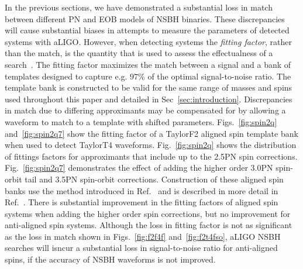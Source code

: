 In the previous sections, we have demonstrated a substantial loss in match between
different \ac{PN} and EOB models of \ac{NSBH} binaries. These discrepancies
will cause substantial biases in attempts to measure the parameters of
detected systems with aLIGO. However, when detecting systems the
\emph{fitting factor}, rather than the match, is the quantity that is used to
assess the effectualness of a search~\cite{Apostolatos:1996rf}. The fitting
factor maximizes the match between a signal and a bank of templates designed
to capture e.g. $97\%$ of the optimal signal-to-noise ratio. The template bank is constructed to be 
valid for the same range of masses and spins used
throughout this paper and detailed in Sec~\ref{sec:introduction}. Discrepancies in
match due to differing approximants may be compensated for by allowing a waveform
to match to a template with shifted parameters.
Figs.~\ref{fig:spin2q} and~\ref{fig:spin2q7} show the fitting
factor of a TaylorF2 aligned spin template bank when used to detect TaylorT4
waveforms. Fig.~\ref{fig:spin2q} shows the distribution of fittings factors for approximants that include up to the 2.5\ac{PN} 
spin corrections. Fig.~\ref{fig:spin2q7} demonstrates the effect of adding the higher order
3.0\ac{PN} spin-orbit tail and 3.5\ac{PN} spin-orbit corrections.
Construction of these aligned spin banks use the method introduced
in Ref.~\cite{Brown:2012qf} and is described in more detail in Ref.~\cite{Harry:2013tca}.
There is substantial improvement in the fitting factors of aligned spin systems when
adding the higher order spin corrections, but no improvement for anti-aligned spin systems. 
Although the loss in fitting factor is not as significant as the loss in match shown in
Figs.~\ref{fig:f2f4f} and~\ref{fig:f2t4fso}, aLIGO \ac{NSBH} searches will isncur a substantial loss in 
signal-to-noise ratio for anti-aligned spins, if the accuracy of \ac{NSBH} waveforms is not improved. 

